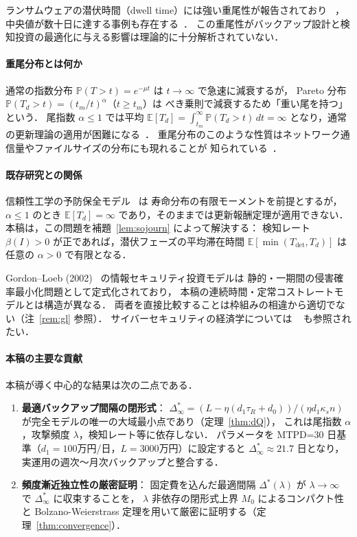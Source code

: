 \documentclass[12pt,a4paper]{article}
\theoremstyle{plain}
\theoremstyle{definition}
\theoremstyle{remark}
\newcommand{\E}{\mathbb{E}}
\newcommand{\Prob}{\mathbb{P}}
\newcommand{\Tdet}{T_{\mathrm{det}}}
\newcommand{\betaI}{\beta(I)}
\newcommand{\Dopt}{\Delta^{*}}
\newcommand{\Dinf}{\Delta^{*}_{\infty}}
\begin{document}
ランサムウェアの潜伏時間（dwell time）には強い重尾性が報告されており
~\cite{mandiant2023,ibm2023,gruber2022,verizon2023,sophos2023,crowdstrike2023}，
中央値が数十日に達する事例も存在する~\cite{ponemon2023}．
この重尾性がバックアップ設計と検知投資の最適化に与える影響は理論的に十分解析されていない．

\paragraph{重尾分布とは何か}
通常の指数分布 $\Prob(T>t)=e^{-\mu t}$ は $t\to\infty$ で急速に減衰するが，
Pareto 分布 $\Prob(T_d>t)=(t_m/t)^\alpha$（$t\ge t_m$）は
べき乗則で減衰するため「重い尾を持つ」という．
尾指数 $\alpha\le1$ では平均 $\E[T_d]=\int_{t_m}^\infty\Prob(T_d>t)\,dt=\infty$
となり，通常の更新理論の適用が困難になる~\cite{feller1971,embrechts1997,resnick2007}．
重尾分布のこのような性質はネットワーク通信量やファイルサイズの分布にも現れることが
知られている~\cite{mitzenmacher2004}．

\paragraph{既存研究との関係}
信頼性工学の予防保全モデル~\cite{barlow1965,nakagawa2005,aven1999} は
寿命分布の有限モーメントを前提とするが，
$\alpha\le1$ のとき $\E[T_d]=\infty$ であり，そのままでは更新報酬定理が適用できない．
本稿は，この問題を補題~\ref{lem:sojourn} によって解決する：
検知レート $\betaI>0$ が正であれば，潜伏フェーズの平均滞在時間 $\E[\min(\Tdet,T_d)]$ は
任意の $\alpha>0$ で有限となる．

Gordon--Loeb (2002)~\cite{gordon2002} の情報セキュリティ投資モデルは
静的・一期間の侵害確率最小化問題として定式化されており，
本稿の連続時間・定常コストレートモデルとは構造が異なる．
両者を直接比較することは枠組みの相違から適切でない（注~\ref{rem:gl} 参照）．
サイバーセキュリティの経済学については
~\cite{gordon2002,hausken2006,laszka2017,anderson2020,fielder2016,moore2009,bohme2010}
も参照されたい．

\paragraph{本稿の主要な貢献}
本稿が導く中心的な結果は次の二点である．
\begin{enumerate}[leftmargin=*]
\item \textbf{最適バックアップ間隔の閉形式}：
  $\Dinf=(L-\eta(d_1\tau_R+d_0))/(\eta d_1\kappa_s n)$
  が完全モデルの唯一の大域最小点であり（定理~\ref{thm:dQ}），
  これは尾指数 $\alpha$，攻撃頻度 $\lambda$，検知レート等に依存しない．
  パラメータを MTPD=30 日基準（$d_1=100$万円/日，$L=3000$万円）に設定すると
  $\Dinf\approx21.7$ 日となり，実運用の週次〜月次バックアップと整合する．
\item \textbf{頻度漸近独立性の厳密証明}：
  固定費を込んだ最適間隔 $\Dopt(\lambda)$ が
  $\lambda\to\infty$ で $\Dinf$ に収束することを，
  $\lambda$ 非依存の閉形式上界 $M_0$ によるコンパクト性と
  Bolzano-Weierstrass 定理を用いて厳密に証明する（定理~\ref{thm:convergence}）．
\end{enumerate}
\end{document}

